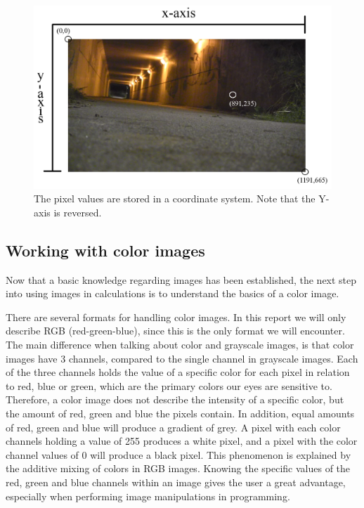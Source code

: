 \begin{figure}[htbp]
\centering
\includegraphics[width=1.00\textwidth]{Pictures/Theory/IndexingAPicture}
\caption{The pixel values are stored in a coordinate system. Note that the Y-axis is reversed.}
\label{fig:ip_IndexingAPicture}
\end{figure}

\subsection{Working with color images}
Now that a basic knowledge regarding images has been established, the next step into using images in calculations is to understand the basics of a color image.

There are several formats for handling color images. In this report we will only describe RGB (red-green-blue), since this is the only format we will encounter. The main difference when talking about color and grayscale images, is that color images have 3 channels, compared to the single channel in grayscale images. Each of the three channels holds the value of a specific color for each pixel in relation to red, blue or green, which are the primary colors our eyes are sensitive to. Therefore, a color image does not describe the intensity of a specific color, but the amount of red, green and blue the pixels contain. In addition, equal amounts of red, green and blue will produce a gradient of grey. A pixel with each color channels holding a value of 255 produces a white pixel, and a pixel with the color channel values of 0 will produce a black pixel. This phenomenon is explained by the additive mixing of colors in RGB images\citep{ip_book}. Knowing the specific values of the red, green and blue channels within an image gives the user a great advantage, especially when performing image manipulations in programming.%

